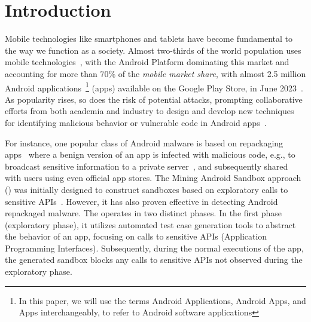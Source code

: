 \section{Introduction}\label{sec:introduction}

Mobile technologies like smartphones and tablets have become fundamental to the way we function as a society. Almost two-thirds of the world population
uses mobile technologies~\cite{Comscore,DBLP:journals/tse/MartinSJZH17}, with the
Android Platform dominating this market and accounting for more than 70\% of the \emph{mobile
market share}, with almost 2.5 million Android applications~\footnote{In this paper, we will use the terms Android Applications, Android Apps, and Apps interchangeably, to refer to Android software applications} (apps)
available on the Google Play Store, in June 2023~\cite{Statista}.  
As popularity rises, so does the risk of potential attacks, prompting collaborative efforts from both academia and industry to design and develop new techniques for identifying malicious behavior or vulnerable code in Android apps~\cite{10.1145/3017427}.

For instance, one popular class of Android malware is based on repackaging apps~\cite{DBLP:conf/wcre/BaoLL18,DBLP:conf/iceccs/LeB0GL18} where a benign
version of an app is
infected with malicious code, e.g., to broadcast
sensitive information to a private server~\cite{DBLP:journals/tse/LiBK21}, and subsequently shared
with users using even official app stores. The Mining Android Sandbox approach (\mas) was initially designed to construct sandboxes based on exploratory calls to sensitive APIs~\cite{DBLP:conf/icse/JamrozikSZ16}. However, it has also proven effective in detecting Android repackaged malware. The \mas operates in two distinct phases. In the first phase (exploratory phase), it utilizes automated test case generation tools to abstract the behavior of an app, focusing on calls to sensitive APIs (Application Programming Interfaces). Subsequently, during the normal executions of the app, the generated sandbox blocks any calls to sensitive APIs not observed during the exploratory phase.


